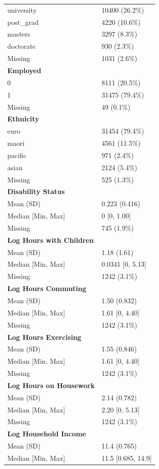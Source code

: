 \documentclass[
  single column]{article}
\begin{document}
\begin{longtable}[]{@{}ll@{}}
university & 10400 (26.2\%) \\
post\_grad & 4220 (10.6\%) \\
masters & 3297 (8.3\%) \\
doctorate & 930 (2.3\%) \\
Missing & 1031 (2.6\%) \\
\textbf{Employed} & \\
0 & 8111 (20.5\%) \\
1 & 31475 (79.4\%) \\
Missing & 49 (0.1\%) \\
\textbf{Ethnicity} & \\
euro & 31454 (79.4\%) \\
maori & 4561 (11.5\%) \\
pacific & 971 (2.4\%) \\
asian & 2124 (5.4\%) \\
Missing & 525 (1.3\%) \\
\textbf{Disability Status} & \\
Mean (SD) & 0.223 (0.416) \\
Median {[}Min, Max{]} & 0 {[}0, 1.00{]} \\
Missing & 745 (1.9\%) \\
\textbf{Log Hours with Children} & \\
Mean (SD) & 1.18 (1.61) \\
Median {[}Min, Max{]} & 0.0341 {[}0, 5.13{]} \\
Missing & 1242 (3.1\%) \\
\textbf{Log Hours Commuting} & \\
Mean (SD) & 1.50 (0.832) \\
Median {[}Min, Max{]} & 1.61 {[}0, 4.40{]} \\
Missing & 1242 (3.1\%) \\
\textbf{Log Hours Exercising} & \\
Mean (SD) & 1.55 (0.846) \\
Median {[}Min, Max{]} & 1.61 {[}0, 4.40{]} \\
Missing & 1242 (3.1\%) \\
\textbf{Log Hours on Housework} & \\
Mean (SD) & 2.14 (0.782) \\
Median {[}Min, Max{]} & 2.20 {[}0, 5.13{]} \\
Missing & 1242 (3.1\%) \\
\textbf{Log Household Income} & \\
Mean (SD) & 11.4 (0.765) \\
Median {[}Min, Max{]} & 11.5 {[}0.685, 14.9{]} \\

\end{longtable}
\end{document}
